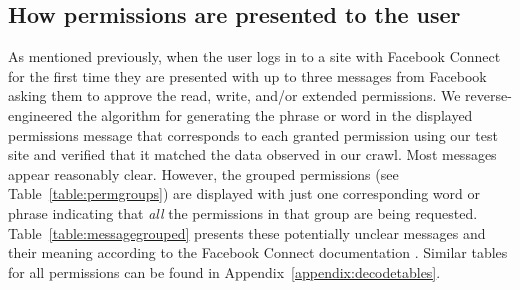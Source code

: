 \documentclass[10pt]{sig-alternate-10pt}
\begin{document}

\subsection{How permissions are presented to the user} 
\label{sec:messages} 

As mentioned previously, when the user logs in to a site with Facebook Connect for the first time they are presented with up to three messages from Facebook asking them to approve the read, write, and/or extended permissions.
We reverse-engineered the algorithm for generating the phrase or word in the displayed permissions message that corresponds to each granted permission using our test site and verified that it matched the data observed in our crawl.
Most messages appear reasonably clear.
However, the grouped permissions (see Table~\ref{table:permgroups}) are displayed with just one corresponding word or phrase indicating that \emph{all} the permissions in that group are being requested. Table~\ref{table:messagegrouped} presents these potentially unclear messages and their meaning according to the Facebook Connect documentation \cite{fbpermissions}. Similar tables for all permissions can be found in Appendix~\ref{appendix:decodetables}.
\end{document}
